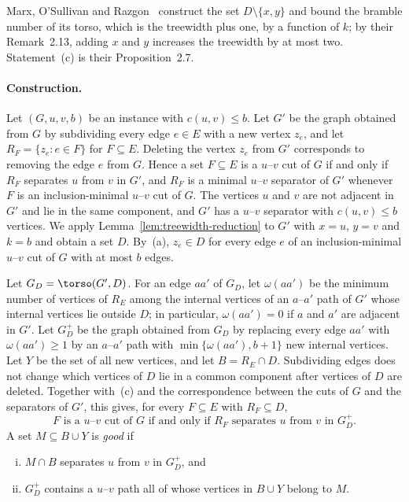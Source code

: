 Marx, O'Sullivan and Razgon~\cite[Lemma~2.11]{Marx2013Separators} construct the set $D \setminus \{x, y\}$ and bound the bramble number of its torso, which is the treewidth plus one, by a function of $k$; by their Remark~2.13, adding $x$ and $y$ increases the treewidth by at most two.
Statement~(c) is their Proposition~2.7.

\paragraph{Construction.}
Let $(G, u, v, b)$ be an instance with $c(u,v) \leq b$.
Let $G'$ be the graph obtained from $G$ by subdividing every edge $e \in E$ with a new vertex $z_e$, and let $R_F = \{z_e : e \in F\}$ for $F \subseteq E$.
Deleting the vertex $z_e$ from $G'$ corresponds to removing the edge $e$ from $G$.
Hence a set $F \subseteq E$ is a $u$--$v$ cut of $G$ if and only if $R_F$ separates $u$ from $v$ in $G'$, and $R_F$ is a minimal $u$--$v$ separator of $G'$ whenever $F$ is an inclusion-minimal $u$--$v$ cut of $G$.
The vertices $u$ and $v$ are not adjacent in $G'$ and lie in the same component, and $G'$ has a $u$--$v$ separator with $c(u,v) \leq b$ vertices.
We apply Lemma~\ref{lem:treewidth-reduction} to $G'$ with $x = u$, $y = v$ and $k = b$ and obtain a set $D$.
By~(a), $z_e \in D$ for every edge $e$ of an inclusion-minimal $u$--$v$ cut of $G$ with at most $b$ edges.

Let $G_D = \torso(G', D)$.
For an edge $aa'$ of $G_D$, let $\omega(aa')$ be the minimum number of vertices of $R_E$ among the internal vertices of an $a$--$a'$ path of $G'$ whose internal vertices lie outside $D$; in particular, $\omega(aa') = 0$ if $a$ and $a'$ are adjacent in $G'$.
Let $G_D^+$ be the graph obtained from $G_D$ by replacing every edge $aa'$ with $\omega(aa') \geq 1$ by an $a$--$a'$ path with $\min\{\omega(aa'), b+1\}$ new internal vertices.
Let $Y$ be the set of all new vertices, and let $B = R_E \cap D$.
Subdividing edges does not change which vertices of $D$ lie in a common component after vertices of $D$ are deleted.
Together with~(c) and the correspondence between the cuts of $G$ and the separators of $G'$, this gives, for every $F \subseteq E$ with $R_F \subseteq D$,
\begin{equation}
\label{eq:cut-separator}
\text{$F$ is a $u$--$v$ cut of $G$ if and only if $R_F$ separates $u$ from $v$ in $G_D^+$.}
\end{equation}
A set $M \subseteq B \cup Y$ is \emph{good} if
\begin{enumerate}[(i)]
    \item $M \cap B$ separates $u$ from $v$ in $G_D^+$, and
    \item $G_D^+$ contains a $u$--$v$ path all of whose vertices in $B \cup Y$ belong to $M$.
\end{enumerate}

